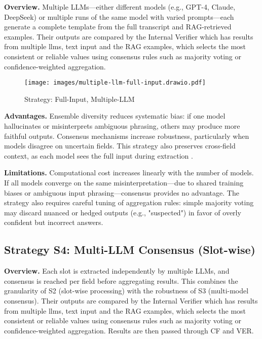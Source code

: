 \textbf{Overview.}  
Multiple LLMs—either different models (e.g., GPT-4, Claude, DeepSeek) or multiple runs of the same model with varied prompts—each generate a complete template from the full transcript and RAG-retrieved examples. Their outputs are compared by the Internal Verifier which has results from multiple llms, text input and the RAG examples, which selects the most consistent or reliable values using consensus rules such as majority voting or confidence-weighted aggregation.

\begin{figure}[H]
  \centering
  \texttt{[image: images/multiple-llm-full-input.drawio.pdf]}
  \caption{Strategy: Full-Input, Multiple-LLM}
  \label{fig:multiple-llm-full-input}
\end{figure}

\textbf{Advantages.}  
Ensemble diversity reduces systematic bias: if one model hallucinates or misinterprets ambiguous phrasing, others may produce more faithful outputs. Consensus mechanisms increase robustness, particularly when models disagree on uncertain fields. This strategy also preserves cross-field context, as each model sees the full input during extraction \cite{wu2023autoagents, park2023generative}.

\textbf{Limitations.}  
Computational cost increases linearly with the number of models. If all models converge on the same misinterpretation—due to shared training biases or ambiguous input phrasing—consensus provides no advantage. The strategy also requires careful tuning of aggregation rules: simple majority voting may discard nuanced or hedged outputs (e.g., "suspected") in favor of overly confident but incorrect answers.

\subsection{Strategy S4: Multi-LLM Consensus (Slot-wise)}
\label{subsec:strategy-s4}

\textbf{Overview.}  
Each slot is extracted independently by multiple LLMs, and consensus is reached per field before aggregating results. This combines the granularity of S2 (slot-wise processing) with the robustness of S3 (multi-model consensus). Their outputs are compared by the Internal Verifier which has results from multiple llms, text input and the RAG examples, which selects the most consistent or reliable values using consensus rules such as majority voting or confidence-weighted aggregation. Results are then passed through CF and VER. 


